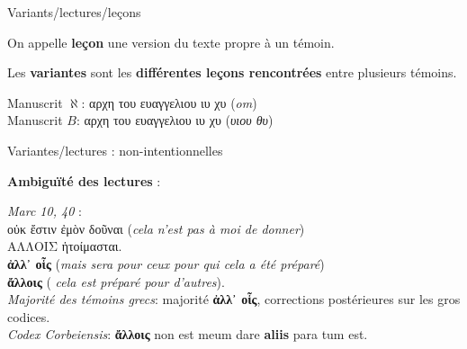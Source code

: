 \documentclass[11pt]{beamer}
\begin{document}
\begin{frame}{Variants/lectures/leçons}

\begin{alertblock}{}
On appelle \textbf{leçon} une version du texte propre à un témoin.
\end{alertblock}
\pause
    \begin{alertblock}{}
    Les \textbf{variantes} sont les \textbf{différentes leçons rencontrées} entre plusieurs témoins.
    \end{alertblock}
\vfill

Manuscrit $\aleph$: \textgreek{αρχη του ευαγγελιου ιυ χυ} (\emph{om})\\
Manuscrit $B$: \textgreek{αρχη του ευαγγελιου ιυ χυ (\emph{υιου θυ})}

\end{frame}

\begin{frame}{Variantes/lectures : non-intentionnelles}

\textbf{Ambiguïté des lectures} :
\begin{block}{}
\emph{Marc 10, 40} :\\
\textgreek{οὐκ ἔστιν ἐμὸν δοῦναι} (\textit{cela n'est pas à moi de donner})\\ \textgreek{ΑΛΛΟΙΣ ἡτοίμασται.} \\
\pause
\vspace{.3cm}
\textgreek{\textbf{ἀλλ᾽ οἷς}} (\textit{mais sera pour ceux pour qui cela a été préparé}) \\
        \textgreek{\textbf{ἄλλοις}} (\textit{ cela est préparé pour d'autres}).\\
\pause
        \vspace{.8cm}
        \textit{Majorité des témoins grecs}: majorité \textbf{ἀλλ᾽ οἷς}, corrections postérieures sur les gros codices.\\

        \textit{Codex Corbeiensis}: \textbf{ἄλλοις} non est meum dare \textbf{aliis} para tum est.
        \end{block}
        \end{frame}
        
\end{document}
